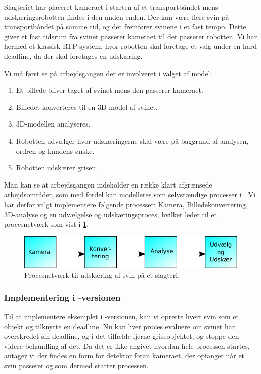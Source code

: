 Slagteriet har placeret kameraet i starten af et transportbåndet mens udskæringsrobotten findes i den anden enden. Der kan være flere svin på transportbåndet på samme tid, og det fremfører svinene i et fast tempo. Dette giver et fast tidsrum fra svinet passerer kameraet til det passerer robotten. Vi har hermed et klassisk RTP system, hvor robotten skal foretage et valg under en hard deadline, da der skal foretages en udskæring.

Vi må først se på arbejdsgangen der er involveret i valget af model:
\begin{enumerate}
\tightlist
	\item Et billede bliver taget af svinet mens den passerer kameraet.
	\item Billedet konverteres til en 3D-model af svinet.
	\item 3D-modellen analyseres.
	\item Robotten udvælger hvor udskæringerne skal være på baggrund af analysen, ordren og kundens ønske.
	\item Robotten udskærer grisen.
\end{enumerate}

Man kan se at arbejdsgangen indeholder en  række klart afgrænsede arbejdsområder, som med fordel kan modelleres som selvstændige processer i \pycsp.  Vi har derfor valgt implementere følgende processer: Kamera, Billedekonvertering, 3D-analyse og en udvælgelse og udskæringsproces, hvilket leder til et procesnetværk som vist i \cref{fig:pig-network}.

\begin{figure}
 \begin{center}
  \includegraphics[scale=1]{images/pig-network}
	\caption{Procesnetværk til udskæring af svin på et slagteri.}
	\label{fig:pig-network}
\end{center}
\end{figure}

\subsubsection*{Implementering i -versionen}
Til at implementere eksemplet i -versionen, kan vi oprette hvert svin som et objekt og tilknytte en deadline. Nu kan hver proces evaluere om svinet har overskredet sin deadline, og i det tilfælde fjerne griseobjektet, og stoppe den videre behandling af det. Da det er ikke angivet hvordan hele processen startes,  antager vi der findes en form for detektor foran kameraet, der opfanger når et svin passerer og som dermed starter processen. 

